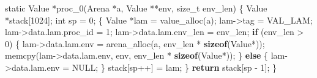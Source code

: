 \documentclass[]{article}
\newenvironment{Shaded}{}{}
\newcommand{\ControlFlowTok}[1]{\textcolor[rgb]{0.00,0.44,0.13}{\textbf{#1}}}
\newcommand{\DataTypeTok}[1]{\textcolor[rgb]{0.56,0.13,0.00}{#1}}
\newcommand{\DecValTok}[1]{\textcolor[rgb]{0.25,0.63,0.44}{#1}}
\newcommand{\KeywordTok}[1]{\textcolor[rgb]{0.00,0.44,0.13}{\textbf{#1}}}
\newcommand{\NormalTok}[1]{#1}
\newcommand{\OperatorTok}[1]{\textcolor[rgb]{0.40,0.40,0.40}{#1}}
\begin{document}
\begin{Shaded}
\begin{Highlighting}[]
\DataTypeTok{static}\NormalTok{ Value }\OperatorTok{*}\NormalTok{proc\_0}\OperatorTok{(}\NormalTok{Arena }\OperatorTok{*}\NormalTok{a}\OperatorTok{,}\NormalTok{ Value }\OperatorTok{**}\NormalTok{env}\OperatorTok{,} \DataTypeTok{size\_t}\NormalTok{ env\_len}\OperatorTok{)} \OperatorTok{\{}
\NormalTok{    Value }\OperatorTok{*}\NormalTok{stack}\OperatorTok{[}\DecValTok{1024}\OperatorTok{];}
    \DataTypeTok{int}\NormalTok{ sp }\OperatorTok{=} \DecValTok{0}\OperatorTok{;}
    \OperatorTok{\{}
\NormalTok{        Value }\OperatorTok{*}\NormalTok{lam }\OperatorTok{=}\NormalTok{ value\_alloc}\OperatorTok{(}\NormalTok{a}\OperatorTok{);}
\NormalTok{        lam}\OperatorTok{{-}\textgreater{}}\NormalTok{tag }\OperatorTok{=}\NormalTok{ VAL\_LAM}\OperatorTok{;}
\NormalTok{        lam}\OperatorTok{{-}\textgreater{}}\NormalTok{data}\OperatorTok{.}\NormalTok{lam}\OperatorTok{.}\NormalTok{proc\_id }\OperatorTok{=} \DecValTok{1}\OperatorTok{;}
\NormalTok{        lam}\OperatorTok{{-}\textgreater{}}\NormalTok{data}\OperatorTok{.}\NormalTok{lam}\OperatorTok{.}\NormalTok{env\_len }\OperatorTok{=}\NormalTok{ env\_len}\OperatorTok{;}
        \ControlFlowTok{if} \OperatorTok{(}\NormalTok{env\_len }\OperatorTok{\textgreater{}} \DecValTok{0}\OperatorTok{)} \OperatorTok{\{}
\NormalTok{            lam}\OperatorTok{{-}\textgreater{}}\NormalTok{data}\OperatorTok{.}\NormalTok{lam}\OperatorTok{.}\NormalTok{env }\OperatorTok{=}\NormalTok{ arena\_alloc}\OperatorTok{(}\NormalTok{a}\OperatorTok{,}\NormalTok{ env\_len }\OperatorTok{*} \KeywordTok{sizeof}\OperatorTok{(}\NormalTok{Value}\OperatorTok{*));}
\NormalTok{            memcpy}\OperatorTok{(}\NormalTok{lam}\OperatorTok{{-}\textgreater{}}\NormalTok{data}\OperatorTok{.}\NormalTok{lam}\OperatorTok{.}\NormalTok{env}\OperatorTok{,}\NormalTok{ env}\OperatorTok{,}\NormalTok{ env\_len }\OperatorTok{*} \KeywordTok{sizeof}\OperatorTok{(}\NormalTok{Value}\OperatorTok{*));}
        \OperatorTok{\}} \ControlFlowTok{else} \OperatorTok{\{}
\NormalTok{            lam}\OperatorTok{{-}\textgreater{}}\NormalTok{data}\OperatorTok{.}\NormalTok{lam}\OperatorTok{.}\NormalTok{env }\OperatorTok{=}\NormalTok{ NULL}\OperatorTok{;}
        \OperatorTok{\}}
\NormalTok{        stack}\OperatorTok{[}\NormalTok{sp}\OperatorTok{++]} \OperatorTok{=}\NormalTok{ lam}\OperatorTok{;}
    \OperatorTok{\}}
    \ControlFlowTok{return}\NormalTok{ stack}\OperatorTok{[}\NormalTok{sp }\OperatorTok{{-}} \DecValTok{1}\OperatorTok{];}
\OperatorTok{\}}


\end{Highlighting}
\end{Shaded}
\end{document}
